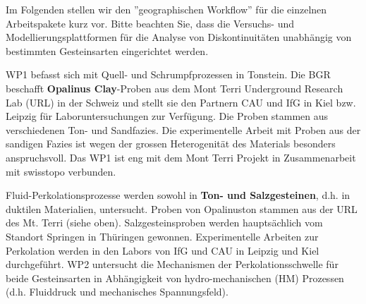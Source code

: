 Im Folgenden stellen wir den ''geographischen Workflow'' für die einzelnen Arbeitspakete kurz vor. Bitte beachten Sie, dass die Versuchs- und Modellierungsplattformen für die Analyse von Diskontinuitäten unabhängig von bestimmten Gesteinsarten eingerichtet werden.

WP1 befasst sich mit Quell- und Schrumpfprozessen in Tonstein. Die BGR beschafft \textbf{Opalinus Clay}-Proben aus dem Mont Terri Underground Research Lab (URL) in der Schweiz und stellt sie den Partnern CAU und IfG in Kiel bzw. Leipzig für Laboruntersuchungen zur Verfügung. Die Proben stammen aus verschiedenen Ton- und Sandfazies. Die experimentelle Arbeit mit Proben aus der sandigen Fazies ist wegen der grossen Heterogenität des Materials besonders anspruchsvoll. Das WP1 ist eng mit dem Mont Terri Projekt in Zusammenarbeit mit swisstopo verbunden.

Fluid-Perkolationsprozesse werden sowohl in \textbf{Ton- und Salzgesteinen}, d.h. in duktilen Materialien, untersucht. Proben von Opalinuston stammen aus der URL des Mt. Terri (siehe oben). Salzgesteinsproben werden hauptsächlich vom Standort Springen in Thüringen gewonnen. Experimentelle Arbeiten zur Perkolation werden in den Labors von IfG und CAU in Leipzig und Kiel durchgeführt. WP2 untersucht die Mechanismen der Perkolationsschwelle für beide Gesteinsarten in Abhängigkeit von hydro-mechanischen (HM) Prozessen (d.h. Fluiddruck und mechanisches Spannungsfeld).

